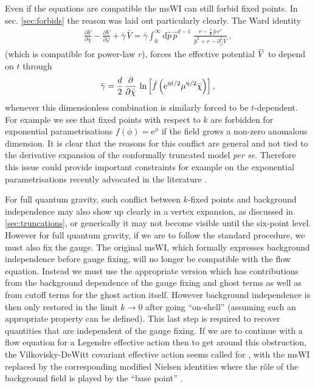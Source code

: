 \documentclass[11pt]{book}
\newcommand{\overbar}[1]{\mkern 1.5mu\overline{\mkern-1.5mu#1\mkern-1.5mu}\mkern 1.5mu}
\newcommand{\bV}{\overbar V}
\newcommand{\bc}{\bar \chi}
\numberwithin{equation}{chapter}
\begin{document}
Even if the equations are compatible the msWI can still forbid fixed points.
In sec. \ref{sec:forbids} the reason was laid out particularly clearly. The Ward identity
\begin{align}
  \frac{\partial \bar V}{\partial \bar\chi} - \frac{\partial \bar V}{\partial \bar\varphi} + \bar \gamma \, \bar V = \bar \gamma
  \int_0^{\infty} \mathrm d\hat p \, \hat p^{d-1} \; \frac{r - \frac{1}{d} \, \hat p \, r'}{\hat p^2 + r - \partial^2_{\bar\varphi}\bar V} \,,
\end{align}
(which is compatible for power-law $r$),
forces the effective potential $\bV$ to depend on $t$ through
\begin{align}
  \bar{\gamma} = \frac{d}{2} \, \frac{\partial}{\partial\bc} \,
  \ln \left[ \bar{f} \left({\rm e}^{\eta t/2}\mu^{\eta/2}\bc \right) \right] ,
\end{align}
whenever this dimensionless combination is similarly forced to be $t$-dependent.
For example we see that fixed points with respect to $k$ are forbidden for exponential parametrisations
$f(\phi) = \mathrm e ^ \phi$  if the field grows a non-zero anomalous dimension.
It is clear that the reasons for this conflict are general and not tied to the derivative expansion
of the conformally truncated model \textit{per se}.
Therefore this issue could provide important constraints for example on the exponential parametrisations
recently advocated in the literature
\cite{Demmel:2015zfa,Eichhorn:2013xr,Eichhorn:2015bna,Nink:2014yya,Percacci:2015wwa,
Ohta:2015efa,Gies:2015tca}.

For full quantum gravity, such conflict between $k$-fixed points and background independence may also
show up clearly in a vertex expansion, as discussed in \ref{sec:truncations},
or generically it may not become visible until the six-point level.
However for full quantum gravity, if we are to follow the standard procedure, we must also fix the gauge.
The original msWI, which formally expresses background independence before gauge fixing,
will no longer be compatible with the flow equation.
Instead we must use the appropriate version which has contributions from the background dependence of
the gauge fixing and ghost terms as well as from cutoff terms for the ghost action itself.
However background independence is then only restored in the limit $k\to0$ after going ``on-shell''
(assuming such an appropriate property can be defined).
This last step is required to recover quantities that are independent of the gauge fixing.
If we are to continue with a flow equation for a Legendre effective action
\cite{Wetterich:1992yh,Morris:1993qb} then to get around this obstruction,
the Vilkovisky-DeWitt covariant effective action seems called for
\cite{Branchina:2003ek,Donkin:2012ud,Demmel:2014hla,Safari:2015dva},
with the msWI replaced by the corresponding modified Nielsen identities where the r\^ole of the background
field is played by the ``base point'' \cite{Pawlowski:2003sk}.
\end{document}
